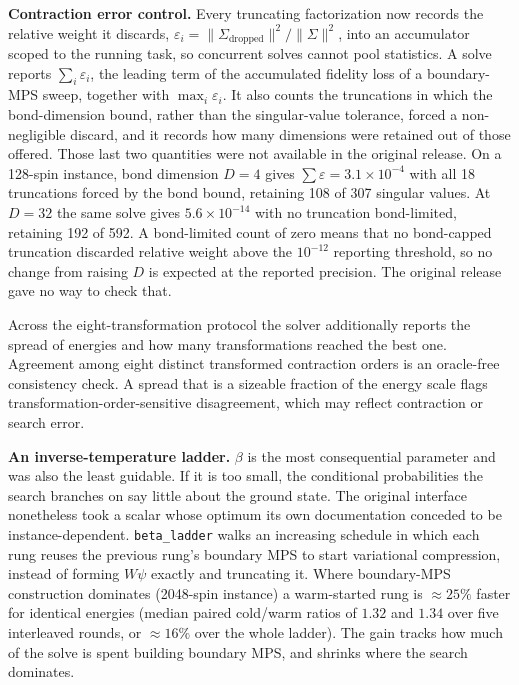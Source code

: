 \documentclass[preprint,12pt,a4paper]{elsarticle}
\begin{document}
\textbf{Contraction error control.} Every truncating factorization now records the
relative weight it discards, $\varepsilon_i =
\lVert\Sigma_{\text{dropped}}\rVert^2/\lVert\Sigma\rVert^2$, into an accumulator
scoped to the running task, so concurrent solves cannot pool statistics. A solve
reports $\sum_i\varepsilon_i$, the leading term of the accumulated fidelity loss of
a boundary-MPS sweep, together with $\max_i\varepsilon_i$. It also counts the
truncations in which the bond-dimension bound, rather than the singular-value
tolerance, forced a non-negligible discard, and it records how many dimensions were
retained out of those offered. Those last two quantities were not available in the
original release. On a 128-spin instance, bond dimension $D=4$ gives
$\sum\varepsilon = 3.1\times10^{-4}$ with all 18 truncations forced by the bond
bound, retaining 108 of 307 singular values. At $D=32$ the same solve gives
$5.6\times10^{-14}$ with no truncation bond-limited, retaining 192 of 592. A
bond-limited count of zero means that no bond-capped truncation discarded relative
weight above the $10^{-12}$ reporting threshold, so no change from raising $D$ is
expected at the reported precision. The original release gave no way to check that.

Across the eight-transformation protocol the solver additionally reports the spread
of energies and how many transformations reached the best one. Agreement among eight
distinct transformed contraction orders is an oracle-free consistency check. A
spread that is a sizeable fraction of the energy scale flags
transformation-order-sensitive disagreement, which may reflect contraction or search
error.

\textbf{An inverse-temperature ladder.} $\beta$ is the most consequential
parameter and was also the least guidable. If it is too small, the conditional
probabilities the search branches on say little about the ground state. The
original interface nonetheless took a scalar whose optimum its own documentation
conceded to be instance-dependent. \texttt{beta\_ladder} walks an increasing
schedule in which each rung reuses the previous rung's boundary MPS to start
variational compression, instead of forming $W\psi$ exactly and truncating it.
Where boundary-MPS construction dominates (2048-spin instance) a warm-started rung
is ${\approx}25\%$ faster for identical energies (median paired cold/warm ratios of
$1.32$ and $1.34$ over five interleaved rounds, or ${\approx}16\%$ over the whole
ladder). The gain tracks how much of the solve is spent building boundary MPS, and
shrinks where the search dominates.
\end{document}
